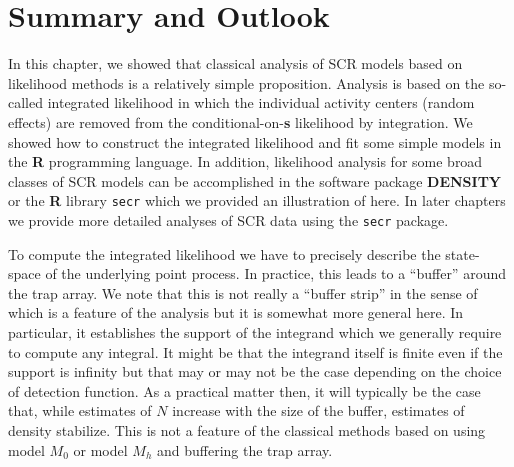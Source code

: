 \section{Summary and Outlook}

In this chapter, we showed that classical analysis of SCR models based
on likelihood methods is a relatively simple proposition.  Analysis is
based on the so-called integrated likelihood in which the individual
activity centers (random effects) are removed from the
conditional-on-{\bf s} likelihood by integration. We showed how to construct
the integrated likelihood and fit some simple models in the {\bf R}
programming language.  In addition, likelihood analysis for some broad
classes of SCR models can be accomplished in the software package
{\bf DENSITY} 
or the {\bf R}
library \mbox{\tt secr} which we provided an illustration of here. In later
chapters we provide more detailed analyses of SCR data using the
\mbox{\tt secr}
package.

To compute the integrated likelihood we have to precisely describe the
state-space of the underlying point process. In practice, this leads
to a ``buffer'' around the trap array. We note that this is not really a
``buffer strip'' in the sense of \citet{wilson_anderson:1985a} 
which is a feature
of the analysis but it is somewhat more general here. In particular,
it establishes the support of the integrand which we generally require
to compute any integral. It might be that the integrand itself is
finite even if the support is infinity but that may or may not be the
case depending on the choice of detection function. As a practical
matter then, it will typically be the case that, while estimates of $N$
increase with the size of the buffer, estimates of density
stabilize. This is not a feature of the classical methods based on
using model $M_0$ or model $M_h$ and buffering the trap array.

